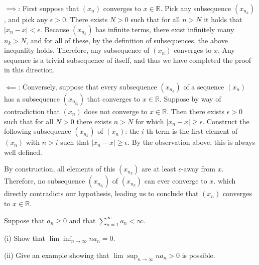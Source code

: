 \begin{solution}

    $\implies$: First suppose that $(x_n)$ converges to $x \in \mathbb{R}$. Pick any subsequence $(x_{n_k})$, and pick any $\epsilon > 0$. There exists $N > 0$ such that for all $n > N$ it holds that $\lvert x_n - x \rvert < \epsilon$. Because $(x_{n_k})$ has infinite terms, there exist infinitely many $n_k > N$, and for all of these, by the definition of subsequences, the above inequality holds. Therefore, any subsequence of $(x_n)$ converges to $x$. Any sequence is a trivial subsequence of itself, and thus we have completed the proof in this direction.

    $\impliedby$: Conversely, suppose that every subsequence $(x_{n_k})$ of a sequence $(x_n)$ has a subsequence $(x_{n_{k_l}})$ that converges to $x \in \mathbb{R}$. Suppose by way of contradiction that $(x_n)$ does not converge to $x \in \mathbb{R}$. Then there exists $\epsilon > 0$ such that for all $N > 0$ there exists $n > N$ for which $\lvert x_n - x \rvert \geq \epsilon$. Construct the following subsequence $(x_{n_k})$ of $(x_n)$: the $i$-th term is the first element of $(x_n)$ with $n > i$ such that $\lvert x_n - x \rvert \geq \epsilon$. By the observation above, this is always well defined.

    By construction, all elements of this $(x_{n_k})$ are at least $\epsilon$-away from $x$. Therefore, no subsequence $(x_{n_{k_l}})$ of $(x_{n_k})$ can ever converge to $x$. which directly contradicts our hypothesis, leading us to conclude that $(x_n)$ converges to $x \in \mathbb{R}$.
\end{solution}

\begin{exercise}{34}
    Suppose that $a_n \geq 0$ and that $\sum_{n=1}^{\infty} a_n < \infty$.

    (i) Show that $\lim \inf_{n \rightarrow \infty} na_n = 0$.

    (ii) Give an example showing that $\lim \sup_{n \rightarrow \infty} n a_n > 0$ is possible.
\end{exercise}

